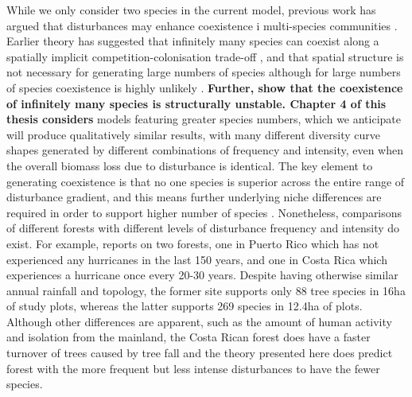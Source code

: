 While we only consider two species in the current model, previous work has argued that disturbances may enhance coexistence i multi-species communities \citep[e.g.][]{loehle2000strategy,roxburgh2004intermediate}. Earlier theory has suggested that infinitely many species can coexist along a spatially implicit competition-colonisation trade-off \citep[e.g.][]{tilman1994competition}, and that spatial structure is not necessary for generating large numbers of species \citep{adler2000space} although for large numbers of species coexistence is highly unlikely \citep[Chapter~1;][]{nattrass2012quantifying}. \textbf{Further, \cite{gyllenberg2005impossibility} show that the coexistence of infinitely many species is structurally unstable. Chapter 4 of this thesis considers} models featuring greater species numbers, which we anticipate will produce qualitatively similar results, with many different diversity curve shapes generated by different combinations of frequency and intensity, even when the overall biomass loss due to disturbance is identical. The key element to generating coexistence is that no one species is superior across the entire range of disturbance gradient, and this means further underlying niche differences are required in order to support higher number of species \citep[e.g.][]{seifan2013beyond}. Nonetheless, comparisons of different forests with different levels of disturbance frequency and intensity do exist. For example, \cite{denslow1987tropical} reports on two forests, one in Puerto Rico which has not experienced any hurricanes in the last 150 years, and one in Costa Rica which experiences a hurricane once every 20-30 years. Despite having otherwise similar annual rainfall and topology, the former site supports only 88 tree species in 16ha of study plots, whereas the latter supports 269 species in 12.4ha of plots. Although other differences are apparent, such as the amount of human activity and isolation from the mainland, the Costa Rican forest does have a faster turnover of trees caused by tree fall and the theory presented here does predict forest with the more frequent but less intense disturbances to have the fewer species.

